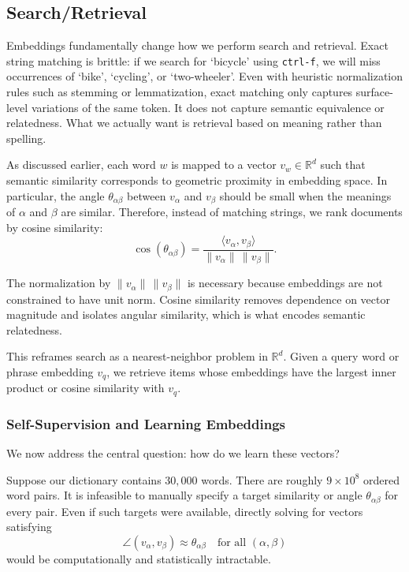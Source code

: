\bigskip

\subsection{Search/Retrieval}

\medskip

Embeddings fundamentally change how we perform search and retrieval. Exact string matching is brittle: if we search for `bicycle' using \texttt{ctrl-f}, we will miss occurrences of `bike', `cycling', or `two-wheeler'. Even with heuristic normalization rules such as stemming or lemmatization, exact matching only captures surface-level variations of the same token. It does not capture semantic equivalence or relatedness. What we actually want is retrieval based on meaning rather than spelling.

As discussed earlier, each word $w$ is mapped to a vector $v_w \in \mathbb{R}^d$ such that semantic similarity corresponds to geometric proximity in embedding space. In particular, the angle $\theta_{\alpha\beta}$ between $v_\alpha$ and $v_\beta$ should be small when the meanings of $\alpha$ and $\beta$ are similar. Therefore, instead of matching strings, we rank documents by cosine similarity:
\[
\cos(\theta_{\alpha\beta}) 
=
\frac{\langle v_\alpha, v_\beta \rangle}
{\|v_\alpha\|\,\|v_\beta\|}.
\]

The normalization by $\|v_\alpha\|\,\|v_\beta\|$ is necessary because embeddings are not constrained to have unit norm. Cosine similarity removes dependence on vector magnitude and isolates angular similarity, which is what encodes semantic relatedness.

\medskip

This reframes search as a nearest-neighbor problem in $\mathbb{R}^d$. Given a query word or phrase embedding $v_q$, we retrieve items whose embeddings have the largest inner product or cosine similarity with $v_q$.

\bigskip

\subsubsection{Self-Supervision and Learning Embeddings}

\medskip

We now address the central question: how do we learn these vectors?

Suppose our dictionary contains $30{,}000$ words. There are roughly $9 \times 10^8$ ordered word pairs. It is infeasible to manually specify a target similarity or angle $\theta_{\alpha\beta}$ for every pair. Even if such targets were available, directly solving for vectors satisfying
\[
\angle(v_\alpha, v_\beta) \approx \theta_{\alpha\beta}
\quad \text{for all } (\alpha,\beta)
\]
would be computationally and statistically intractable.

